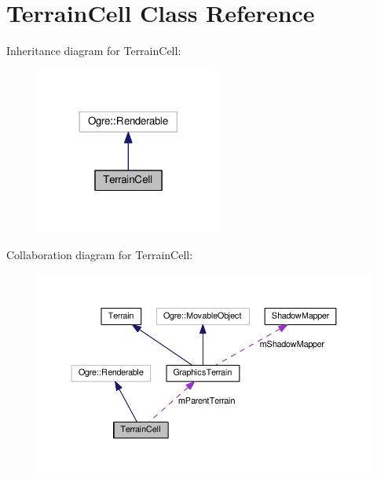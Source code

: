 \hypertarget{class_terrain_cell}{}\section{Terrain\+Cell Class Reference}
\label{class_terrain_cell}


Inheritance diagram for Terrain\+Cell\+:\nopagebreak
\begin{figure}[H]
\begin{center}
\leavevmode
\includegraphics[width=173pt]{class_terrain_cell__inherit__graph}
\end{center}
\end{figure}


Collaboration diagram for Terrain\+Cell\+:\nopagebreak
\begin{figure}[H]
\begin{center}
\leavevmode
\includegraphics[width=350pt]{class_terrain_cell__coll__graph}
\end{center}
\end{figure}
